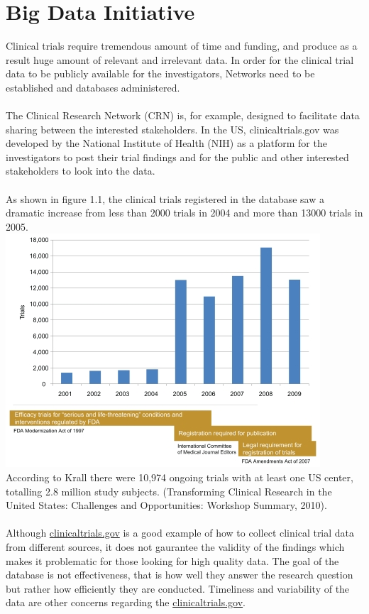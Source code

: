 \documentclass[paper=a4, fontsize=12pt]{article}
\begin{document}
\section*{Big Data Initiative}
Clinical trials require tremendous amount of time and funding, and produce as a result huge amount of relevant and irrelevant data. In order for the clinical trial data to be publicly available for the investigators, Networks need to be established and databases administered. \\\\
The Clinical Research Network (CRN) is, for example, designed to facilitate data sharing between the interested stakeholders. In the US, clinicaltrials.gov was developed by the  National Institute of Health (NIH) as a platform for the investigators to post their trial findings and for the public and other interested stakeholders to look into the data.\\\\
As shown in figure 1.1, the clinical trials registered in the database saw a dramatic increase from less than 2000 trials in 2004 and more than 13000 trials in 2005.\\
\includegraphics[width=\textwidth]{trialdata}\\
According to Krall there were 10,974 ongoing trials with at least one US center, totalling 2.8 million study subjects. (Transforming Clinical Research in the United States: Challenges and Opportunities: Workshop Summary, 2010).\\\\
Although \href{clinicaltrials.gov}{clinicaltrials.gov} is a good example of how to collect clinical trial data from different sources, it does not gaurantee the validity of the findings which makes it problematic for those looking for high quality data. The goal of the database is not effectiveness, that is how well they answer the research question but rather how efficiently they are conducted. 
Timeliness and variability of the data are other concerns regarding the \href{clinicaltrials.gov}{clinicaltrials.gov}.
\end{document}
